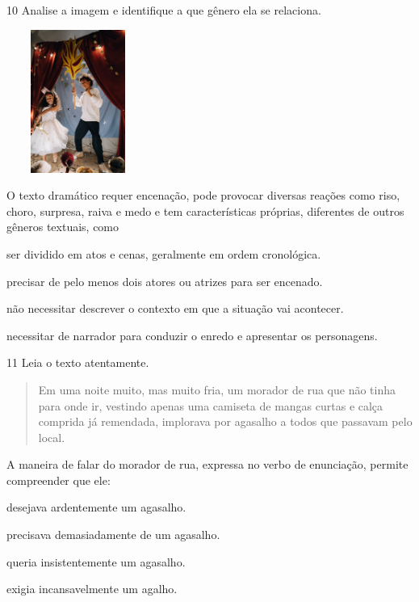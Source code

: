 \num{10} Analise a imagem e identifique a que gênero ela se relaciona.

\includegraphics[width=1.84348in,height=1.84348in]{media/image1.jpeg}


O texto dramático requer encenação, pode provocar diversas reações como
riso, choro, surpresa, raiva e medo e tem características próprias,
diferentes de outros gêneros textuais, como

\begin{escolha}
\item ser dividido em atos e cenas, geralmente em ordem cronológica.

\item precisar de pelo menos dois atores ou atrizes para ser encenado.

\item não necessitar descrever o contexto em que a situação vai acontecer.

\item necessitar de narrador para conduzir o enredo e apresentar os personagens.
\end{escolha}



\num{11} Leia o texto atentamente.

\begin{quote}
Em uma noite muito, mas muito fria, um morador de rua que não tinha para
onde ir, vestindo apenas uma camiseta de mangas curtas e calça comprida
já remendada, implorava por agasalho a todos que passavam pelo local.

\end{quote}

A maneira de falar do morador de rua, expressa no verbo de enunciação,
permite compreender que ele:

\begin{escolha}
\item desejava ardentemente um agasalho.

\item precisava demasiadamente de um agasalho.

\item queria insistentemente um agasalho.

\item exigia incansavelmente um agalho.
\end{escolha}



